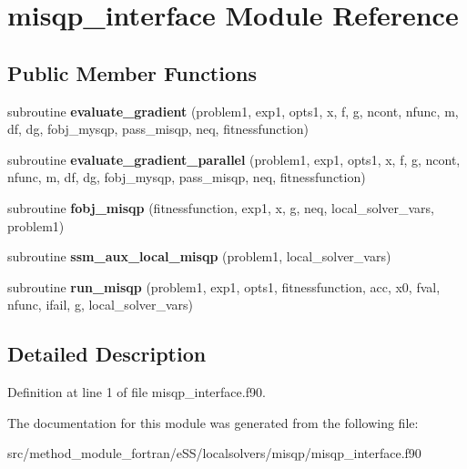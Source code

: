 \hypertarget{classmisqp__interface}{\section{misqp\-\_\-interface Module Reference}
\label{classmisqp__interface}
}
\subsection*{Public Member Functions}
\begin{DoxyCompactItemize}
\item 
\hypertarget{classmisqp__interface_a0686542c773624d84c87879b6328e6c8}{subroutine {\bfseries evaluate\-\_\-gradient} (problem1, exp1, opts1, x, f, g, ncont, nfunc, m, df, dg, fobj\-\_\-mysqp, pass\-\_\-misqp, neq, fitnessfunction)}\label{classmisqp__interface_a0686542c773624d84c87879b6328e6c8}

\item 
\hypertarget{classmisqp__interface_a8cc28ada4e5eca70058697ca5f9cd38c}{subroutine {\bfseries evaluate\-\_\-gradient\-\_\-parallel} (problem1, exp1, opts1, x, f, g, ncont, nfunc, m, df, dg, fobj\-\_\-mysqp, pass\-\_\-misqp, neq, fitnessfunction)}\label{classmisqp__interface_a8cc28ada4e5eca70058697ca5f9cd38c}

\item 
\hypertarget{classmisqp__interface_a174c94d02a06d6535174c5849e19ebcc}{subroutine {\bfseries fobj\-\_\-misqp} (fitnessfunction, exp1, x, g, neq, local\-\_\-solver\-\_\-vars, problem1)}\label{classmisqp__interface_a174c94d02a06d6535174c5849e19ebcc}

\item 
\hypertarget{classmisqp__interface_a7a376b85dead9dd9ca0df26f54782d81}{subroutine {\bfseries ssm\-\_\-aux\-\_\-local\-\_\-misqp} (problem1, local\-\_\-solver\-\_\-vars)}\label{classmisqp__interface_a7a376b85dead9dd9ca0df26f54782d81}

\item 
\hypertarget{classmisqp__interface_ac0caeb819b2719004babe688373150f8}{subroutine {\bfseries run\-\_\-misqp} (problem1, exp1, opts1, fitnessfunction, acc, x0, fval, nfunc, ifail, g, local\-\_\-solver\-\_\-vars)}\label{classmisqp__interface_ac0caeb819b2719004babe688373150f8}

\end{DoxyCompactItemize}


\subsection{Detailed Description}


Definition at line 1 of file misqp\-\_\-interface.\-f90.



The documentation for this module was generated from the following file\-:\begin{DoxyCompactItemize}
\item 
src/method\-\_\-module\-\_\-fortran/e\-S\-S/localsolvers/misqp/misqp\-\_\-interface.\-f90\end{DoxyCompactItemize}
